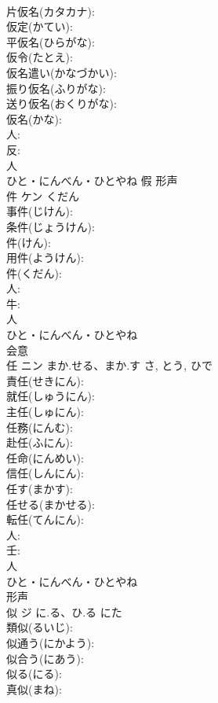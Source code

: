 \documentclass[8pt]{extreport}
\begin{document}
\begin{CJK}{UTF8}{min}
\\	片仮名(カタカナ): 
\\	仮定(かてい): 
\\	平仮名(ひらがな): 
\\	仮令(たとえ): 
\\	仮名遣い(かなづかい): 
\\	振り仮名(ふりがな): 
\\	送り仮名(おくりがな): 
\\	仮名(かな): 
\\	人: 
\\	反: 
\\	人	
\\	ひと・にんべん・ひとやね	假	形声 
\\	件	ケン	くだん		
\\	事件(じけん): 
\\	条件(じょうけん): 
\\	件(けん): 
\\	用件(ようけん): 
\\	件(くだん): 
\\	人: 
\\	牛: 
\\	人	
\\	ひと・にんべん・ひとやね	
\\	会意 
\\	任	ニン	まか.せる、まか.す	さ, とう, ひで	
\\	責任(せきにん): 
\\	就任(しゅうにん): 
\\	主任(しゅにん): 
\\	任務(にんむ): 
\\	赴任(ふにん): 
\\	任命(にんめい): 
\\	信任(しんにん): 
\\	任す(まかす): 
\\	任せる(まかせる): 
\\	転任(てんにん): 
\\	人: 
\\	壬: 
\\	人	
\\	ひと・にんべん・ひとやね	
\\	形声 
\\	似	ジ	に.る、ひ.る	にた	
\\	類似(るいじ): 
\\	似通う(にかよう): 
\\	似合う(にあう): 
\\	似る(にる): 
\\	真似(まね): 

\end{CJK}
\end{document}
